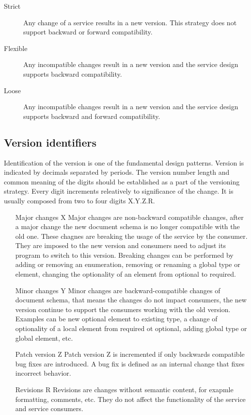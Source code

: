 \begin{description}
  \item[Strict] 
  Any change of a service results in a new version. This strategy does not support backward or forward compatibility.
  \item[Flexible]
  Any incompatible changes result in a new version and the service design supports backward compatibility.
  \item[Loose]
  Any incompatible changes result in a new version and the service design supports backward and forward compatibility.
\end{description}

\subsection{Version identifiers}
Identification of the version is one of the fundamental design patterns. Version is indicated by decimals separated by periods. The version number length and common meaning of the digits should be established as a part of the versioning strategy. Every digit increments releatively to significance of the change. It is usually composed from two to four digits X.Y.Z.R.

\begin{enumerate}
  \item[Major changes X]
  Major changes are non-backward compatible changes, after a major change the new document schema is no longer compatible with the old one. These chagnes are breaking the usage of the service by the consumer. They are imposed to the new version and consumers need to adjust its program to switch to this version. Breaking changes can be performed by adding or removing an enumeration, removing or renaming a global type or element, changing the optionality of an element from optional to required.
    \item[Minor changes Y]
  Minor changes are backward-compatible changes of document schema, that means the changes do not impact consumers, the new version continue to support the consumers working with the old version. Examples can be new optional element to existing type, a change of optionality of a local element from required ot optional, adding global type or global element, etc.
  \item[Patch version Z]
  Patch version Z is incremented if only backwards compatible bug fixes are introduced. A bug fix is defined as an internal change that fixes incorrect behavior.
  \item[Revisions R]
  Revisions are changes without semantic content, for exapmle formatting, comments, etc. They do not affect the functionality of the service and service consumers.
\end{enumerate} 

